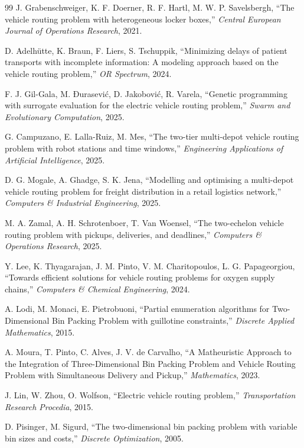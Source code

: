 \begin{thebibliography}{99}
J. Grabenschweiger, K. F. Doerner, R. F. Hartl, M. W. P. Savelsbergh,
“The vehicle routing problem with heterogeneous locker boxes,”
\textit{Central European Journal of Operations Research}, 2021.

D. Adelhütte, K. Braun, F. Liers, S. Tschuppik,
“Minimizing delays of patient transports with incomplete information: A modeling approach based on the vehicle routing problem,”
\textit{OR Spectrum}, 2024.

F. J. Gil-Gala, M. Đurasević, D. Jakobović, R. Varela,
“Genetic programming with surrogate evaluation for the electric vehicle routing problem,”
\textit{Swarm and Evolutionary Computation}, 2025.

G. Campuzano, E. Lalla-Ruiz, M. Mes,
“The two-tier multi-depot vehicle routing problem with robot stations and time windows,”
\textit{Engineering Applications of Artificial Intelligence}, 2025.

D. G. Mogale, A. Ghadge, S. K. Jena,
“Modelling and optimising a multi-depot vehicle routing problem for freight distribution in a retail logistics network,”
\textit{Computers \& Industrial Engineering}, 2025.

M. A. Zamal, A. H. Schrotenboer, T. Van Woensel,
“The two-echelon vehicle routing problem with pickups, deliveries, and deadlines,”
\textit{Computers \& Operations Research}, 2025.

Y. Lee, K. Thyagarajan, J. M. Pinto, V. M. Charitopoulos, L. G. Papageorgiou,
“Towards efficient solutions for vehicle routing problems for oxygen supply chains,”
\textit{Computers \& Chemical Engineering}, 2024.

A. Lodi, M. Monaci, E. Pietrobuoni,
“Partial enumeration algorithms for Two-Dimensional Bin Packing Problem with guillotine constraints,”
\textit{Discrete Applied Mathematics}, 2015.

A. Moura, T. Pinto, C. Alves, J. V. de Carvalho,
“A Matheuristic Approach to the Integration of Three-Dimensional Bin Packing Problem and Vehicle Routing Problem with Simultaneous Delivery and Pickup,”
\textit{Mathematics}, 2023.

J. Lin, W. Zhou, O. Wolfson,
“Electric vehicle routing problem,”
\textit{Transportation Research Procedia}, 2015.

D. Pisinger, M. Sigurd,
“The two-dimensional bin packing problem with variable bin sizes and costs,”
\textit{Discrete Optimization}, 2005.


\end{thebibliography}

